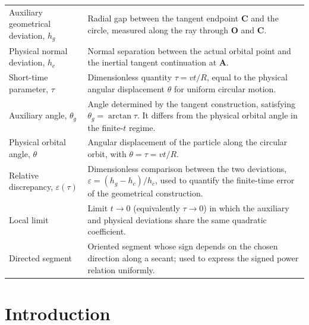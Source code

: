 \documentclass[preprint,12pt,3p,nopreprintline]{elsarticle}
\newcommand{\pt}[1]{\mathbf{#1}}
\numberwithin{equation}{section}
\theoremstyle{remark}
\begin{document}
\begin{tabularx}{\textwidth}{@{}>{\raggedright\arraybackslash}p{}X@{}}
Auxiliary geometrical deviation, $h_g$ &
Radial gap between the tangent endpoint $\pt{C}$ and the circle, measured along the ray through $\pt{O}$ and $\pt{C}$. \\

Physical normal deviation, $h_c$ &
Normal separation between the actual orbital point and the inertial tangent continuation at $\pt{A}$. \\

Short-time parameter, $\tau$ &
Dimensionless quantity $\tau=vt/R$, equal to the physical angular displacement $\theta$ for uniform circular motion. \\

Auxiliary angle, $\theta_g$ &
Angle determined by the tangent construction, satisfying $\theta_g=\arctan\tau$. It differs from the physical orbital angle in the finite-$t$ regime. \\

Physical orbital angle, $\theta$ &
Angular displacement of the particle along the circular orbit, with $\theta=\tau=vt/R$. \\

Relative discrepancy, $\varepsilon(\tau)$ &
Dimensionless comparison between the two deviations, $\varepsilon=(h_g-h_c)/h_c$, used to quantify the finite-time error of the geometrical construction. \\

Local limit &
Limit $t\to0$ (equivalently $\tau\to0$) in which the auxiliary and physical deviations share the same quadratic coefficient. \\

Directed segment &
Oriented segment whose sign depends on the chosen direction along a secant; used to express the signed power relation uniformly. \\

\bottomrule
\end{tabularx}

\clearpage
\thispagestyle{plain}

\section{Introduction}
\end{document}
